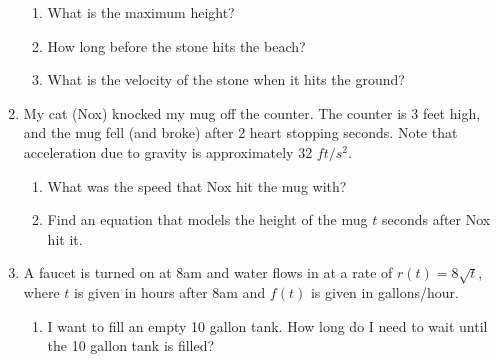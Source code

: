 \documentclass{article}[12pt]
\theoremstyle{definition}
\theoremstyle{example}
\theoremstyle{theorem}
\begin{document}
\begin{enumerate}
\begin{enumerate}
\item What is the maximum height?
\item How long before the stone hits the beach?
\item What is the velocity of the stone when it hits the ground?
\end{enumerate}
\item My cat (Nox) knocked my mug off the counter. The counter is 3 feet high, and the mug fell (and broke) after 2 heart stopping seconds.  Note that acceleration due to gravity is approximately 32 $ft/s^2$. 
\begin{enumerate}
\item What was the speed that Nox hit the mug with? 
\item Find an equation that models the height of the mug $t$ seconds after Nox hit it. 
\end{enumerate}
\item A faucet is turned on at 8am and water flows in at a rate of $r(t)=8\sqrt{t}$, where $t$ is given in hours after 8am and $f(t)$ is given in gallons/hour. 
\begin{enumerate}
\item I want to fill an empty 10 gallon tank. How long do I need to wait until the 10 gallon tank is filled? 
\end{enumerate}
\end{enumerate}
\end{document}
